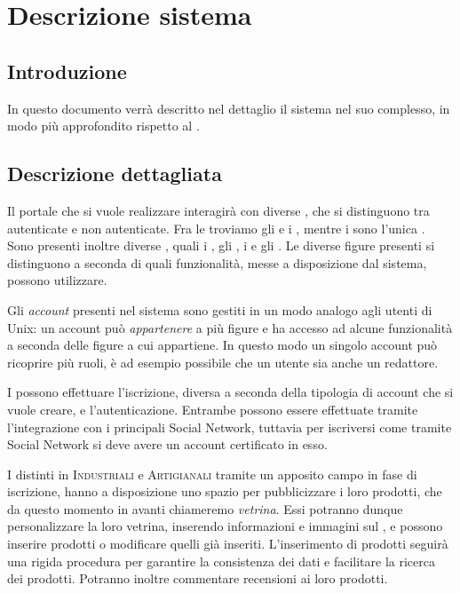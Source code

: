\chapter{Descrizione sistema} 
\label{cha:specifica_sistema}

\section{Introduzione} 
In questo documento verrà descritto nel dettaglio il sistema nel suo complesso, in modo più approfondito rispetto al .

\section{Descrizione dettagliata} 
\label{sec:descrizione_dettagliata}
Il portale che si vuole realizzare interagirà con diverse , che si distinguono tra autenticate e non autenticate. Fra le  troviamo gli  e i , mentre i  sono l'unica .
Sono presenti inoltre diverse , quali i , gli , i  e gli .
Le diverse figure presenti si distinguono a seconda di quali funzionalità, messe a disposizione dal sistema, possono utilizzare. 

\bigskip
\noindent
Gli \emph{account} presenti nel sistema sono gestiti in un modo analogo agli utenti di Unix: un account può \emph{appartenere} a più figure e ha accesso ad alcune funzionalità a seconda delle figure a cui appartiene. In questo modo un singolo account può ricoprire più ruoli, è ad esempio possibile che un utente sia anche un redattore.

I  possono effettuare l'iscrizione, diversa a seconda della tipologia di account che si vuole creare, e l'autenticazione. Entrambe possono essere effettuate tramite l'integrazione con i principali Social Network, tuttavia per iscriversi come  tramite Social Network si deve avere un account certificato in esso.

I  distinti in \textsc{Industriali} e \textsc{Artigianali} tramite un apposito campo in fase di iscrizione, hanno a disposizione uno spazio per pubblicizzare i loro prodotti, che da questo momento in avanti chiameremo \emph{vetrina}. Essi potranno dunque personalizzare la loro vetrina, inserendo informazioni e immagini sul , e possono inserire prodotti o modificare quelli già inseriti. L'inserimento di prodotti seguirà una rigida procedura per garantire la consistenza dei dati e facilitare la ricerca dei prodotti. Potranno inoltre commentare recensioni ai loro prodotti.

